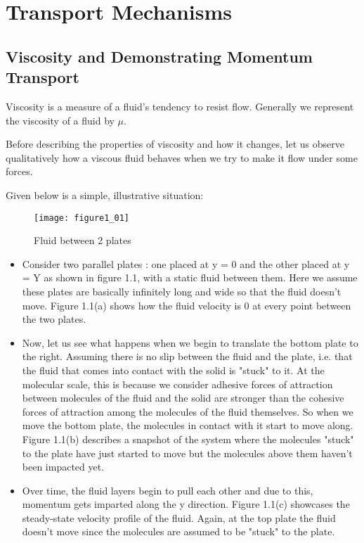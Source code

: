 \chapter{Transport Mechanisms}

\section{Viscosity and Demonstrating Momentum Transport}

Viscosity is a measure of a fluid's tendency to resist flow. Generally we represent the viscosity of a fluid by $\mu$. 

Before describing the properties of viscosity and how it changes, let us observe qualitatively how a viscous fluid behaves when we try to make it flow under some forces.

Given below is a simple, illustrative situation:

\begin{figure}[h]
    \centering
    \texttt{[image: figure1\_01]}
    \caption{Fluid between 2 plates}
\end{figure}

\begin{itemize}
    \item Consider two parallel plates : one placed at y = 0 and the other placed at y = Y as shown in figure 1.1, with a static fluid between them. Here we assume these plates are basically infinitely long and wide so that the fluid doesn't move. Figure 1.1(a) shows how the fluid velocity is 0 at every point between the two plates. 

    \item Now, let us see what happens when we begin to translate the bottom plate to the right. Assuming there is no slip between the fluid and the plate, i.e. that the fluid that comes into contact with the solid is "stuck" to it. At the molecular scale, this is because we consider adhesive forces of attraction between molecules of the fluid and the solid are stronger than the cohesive forces of attraction among the molecules of the fluid themselves. So when we move the bottom plate, the molecules in contact with it start to move along. Figure 1.1(b) describes a snapshot of the system where the molecules "stuck" to the plate have just started to move but the molecules above them haven't been impacted yet.

    \item Over time, the fluid layers begin to pull each other and due to this, momentum gets imparted along the y direction. Figure 1.1(c) showcases the steady-state velocity profile of the fluid. Again, at the top plate the fluid doesn't move since the molecules are assumed to be "stuck" to the plate. 
\end{itemize}

